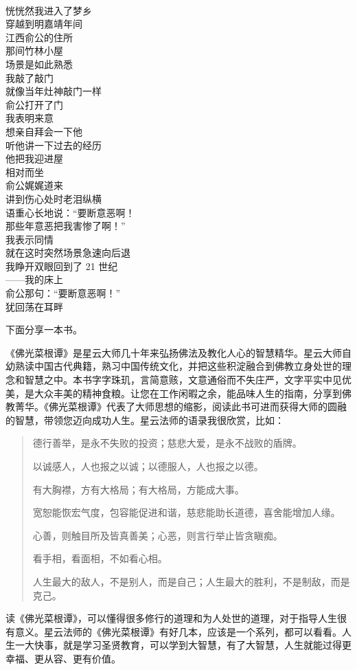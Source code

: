 \begin{poem}[梦遇俞公记]
    \begin{multicols}{3}
        \centering~\\
        恍恍然我进入了梦乡 \\ 穿越到明嘉靖年间 \\ 江西俞公的住所 \\ 那间竹林小屋 \\ 场景是如此熟悉 \\ 我敲了敲门 \\ 就像当年灶神敲门一样 \\ 俞公打开了门 \\ 我表明来意 \\ 想亲自拜会一下他 \\ 听他讲一下过去的经历 \\ 他把我迎进屋 \\ 相对而坐 \\ 俞公娓娓道来 \\ 讲到伤心处时老泪纵横 \\ 语重心长地说：“要断意恶啊！ \\ 那些年意恶把我害惨了啊！” \\ 我表示同情 \\ 就在这时突然场景急速向后退 \\ 我睁开双眼回到了 21 世纪 \\ ——我的床上 \\ 俞公那句：“要断意恶啊！” \\ 犹回荡在耳畔
    \end{multicols}
\end{poem}

下面分享一本书。

\begin{book}
    《佛光菜根谭》是星云大师几十年来弘扬佛法及教化人心的智慧精华。星云大师自幼熟读中国古代典籍，熟习中国传统文化，并把这些积淀融合到佛教立身处世的理念和智慧之中。本书字字珠玑，言简意赅，文意通俗而不失庄严，文字平实中见优美，是大众丰美的精神食粮。让您在工作闲暇之余，能品味人生的指南，分享到佛教菁华。《佛光菜根谭》代表了大师思想的缩影，阅读此书可进而获得大师的圆融的智慧，带领您迈向成功人生。星云法师的语录我很欣赏，比如：\begin{quotation}
        德行善举，是永不失败的投资；慈悲大爱，是永不战败的盾牌。

        以诚感人，人也报之以诚；以德服人，人也报之以德。

        有大胸襟，方有大格局；有大格局，方能成大事。

        宽恕能恢宏气度，包容能促进和谐，慈悲能助长道德，喜舍能增加人缘。

        心善，则触目所及皆真善美；心恶，则言行举止皆贪瞋痴。

        看手相，看面相，不如看心相。

        人生最大的敌人，不是别人，而是自己；人生最大的胜利，不是制敌，而是克己。
    \end{quotation} 读《佛光菜根谭》，可以懂得很多修行的道理和为人处世的道理，对于指导人生很有意义。星云法师的《佛光菜根谭》有好几本，应该是一个系列，都可以看看。人生一大快事，就是学习圣贤教育，可以学到大智慧，有了大智慧，人生就能过得更幸福、更从容、更有价值。
\end{book}

